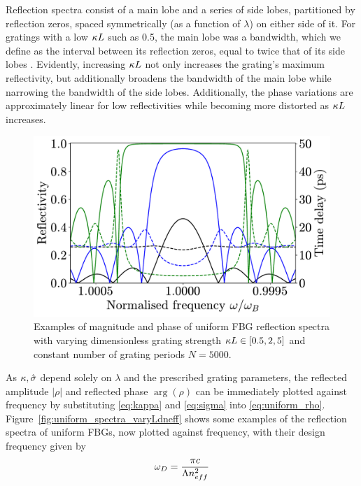 Reflection spectra consist of a main lobe and a series of side lobes, partitioned by reflection zeros, spaced symmetrically (as a function of $\lambda$) on either side of it. 
For gratings with a low $\kappa L$ such as 0.5, the main lobe was a bandwidth, which we define as the interval between its reflection zeros, equal to twice that of its side lobes \cite{erdogan1997fiber}. 
Evidently, increasing $\kappa L$ not only increases the grating's maximum reflectivity, but additionally broadens the bandwidth of the main lobe while narrowing the bandwidth of the side lobes. 
Additionally, the phase variations are approximately linear for low reflectivities while becoming more distorted as $\kappa L$ increases.
%
\begin{figure}
    
\includegraphics[width=\linewidth]{Images/Uniform_varying_kL_Rtau.pdf}

\caption{Examples of magnitude and phase of uniform FBG reflection spectra with varying dimensionless grating strength $\kappa L \in [0.5, 2, 5]$ and constant number of grating periods $N=5000$.}

\label{fig:uniform_spectra_varykL}
\end{figure}
%
\par
%
As $\kappa, \hat{\sigma}$ depend solely on $\lambda$ and the prescribed grating parameters, 
the reflected amplitude $|\rho|$ and reflected phase $\arg(\rho)$ can be immediately plotted against frequency by substituting \eqref{eq:kappa} and \eqref{eq:sigma} into \eqref{eq:uniform_rho}. 
Figure~\ref{fig:uniform_spectra_varyLdneff} shows some examples of the reflection spectra of uniform FBGs, now plotted against frequency, with their design frequency given by
%
\begin{equation}
    \omega_D = \frac{\pi c}{\Lambda n_{eff}^2}
\end{equation}
